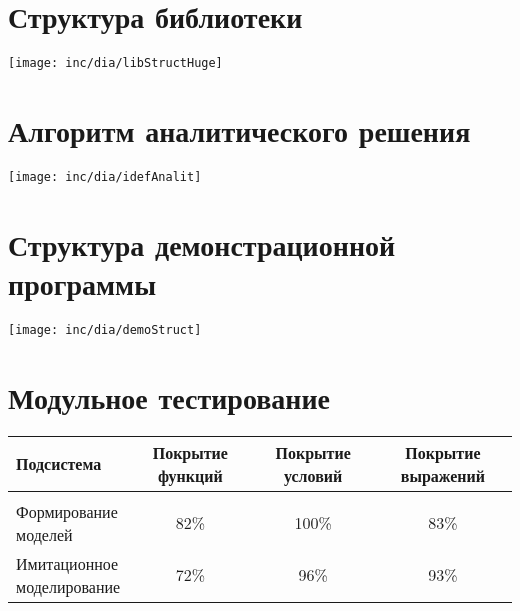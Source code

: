 \documentclass[12pt]{article}
\begin{document}
\section{Структура библиотеки}
\texttt{[image: inc/dia/libStructHuge]}


\section{Алгоритм аналитического решения}
\vfill
\texttt{[image: inc/dia/idefAnalit]}
\vfill

\section{Структура демонстрационной программы}
\texttt{[image: inc/dia/demoStruct]}





\section{Модульное  тестирование}
\raggedright
\footnotesize
\begin{tabular}{|l|c|c|c|}
\hline
Подсистема & Покрытие функций & Покрытие условий & Покрытие выражений\\
\hline
& & & \\
\hline
\parbox{0.25\textwidth} {Формирование \\моделей }& 82\% & 100\% & 83\% \\
\hline
\parbox{0.25\textwidth} {Имитационное \\моделирование }& 72\% & 96\% & 93\% \\
\hline
\end{tabular}


\end{document}
